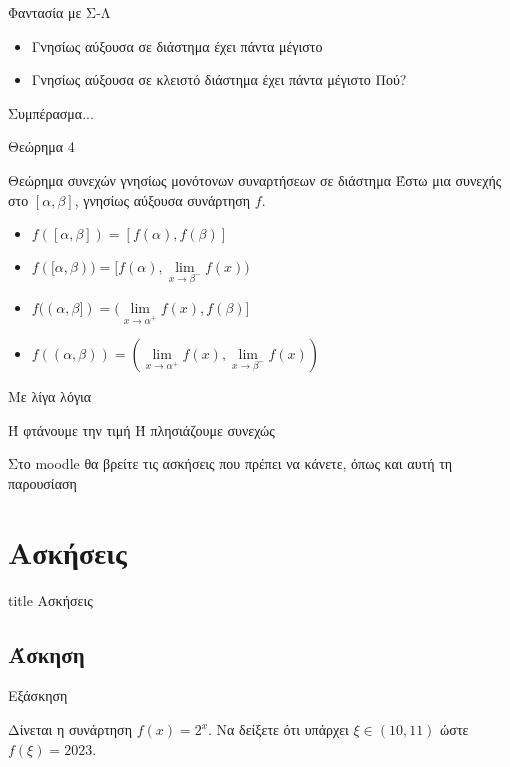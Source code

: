 \documentclass[greek]{beamer}
\newcounter{askisi} %
\newenvironment{askisi}
{
  \refstepcounter{askisi}\par
  \subsection{Άσκηση \theaskisi}
  \begin{frame}[label=Άσκηση\theaskisi,t]{Εξάσκηση \theaskisi}
}{
  \end{frame}
}
\begin{document}
\begin{frame}{Φαντασία με Σ-Λ}
      \begin{itemize}
            \item<1-> Γνησίως αύξουσα σε διάστημα έχει πάντα μέγιστο
            \item<2-> Γνησίως αύξουσα σε κλειστό διάστημα έχει πάντα μέγιστο  Πού?
      \end{itemize}
      Συμπέρασμα...
\end{frame}

\begin{frame}{Θεώρημα 4}
      \begin{block}{Θεώρημα συνεχών γνησίως μονότονων συναρτήσεων σε διάστημα}
            Έστω μια συνεχής στο $[α,β]$, γνησίως αύξουσα συνάρτηση $f$.
            \begin{itemize}
                  \item<1-> $f([α,β])=[f(α),f(β)]$
                  \item<2-> $f([α,β))=[f(α),\lim\limits_{x \to β^-}{ f(x) })$
                  \item<3-> $f((α,β])=(\lim\limits_{x \to α^+}{ f(x) },f(β)]$
                  \item<4-> $f((α,β))=(\lim\limits_{x \to α^+}{ f(x) },\lim\limits_{x \to β^-}{ f(x) })$
            \end{itemize}
      \end{block}
      Με λίγα λόγια

      Ή φτάνουμε την τιμή Ή πλησιάζουμε συνεχώς
\end{frame}

\begin{frame}[noframenumbering]
      Στο moodle θα βρείτε τις ασκήσεις που πρέπει να κάνετε, όπως και αυτή τη παρουσίαση
\end{frame}

\section{Ασκήσεις}

\begin{frame}[noframenumbering]
      \vfill
      \centering
      \begin{beamercolorbox}[sep=8pt,center,shadow=true,rounded=true]{title}
            Ασκήσεις
      \end{beamercolorbox}
      \vfill
\end{frame}

\begin{askisi}
      Δίνεται η συνάρτηση $f(x)=2^x$. Να δείξετε ότι υπάρχει $ξ\in (10,11)$ ώστε $f(ξ)=2023$.

      \hyperlink{Λύση1}{}
\end{askisi}
\end{document}
